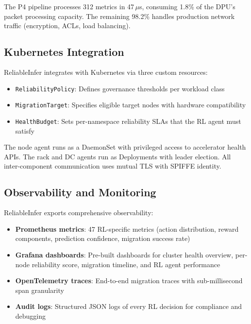 \documentclass[conference,10pt,letterpaper]{IEEEtran}
\begin{document}
The P4 pipeline processes 312 metrics in 47\,$\mu$s, consuming 1.8\% of the DPU's packet processing capacity. The remaining 98.2\% handles production network traffic (encryption, ACLs, load balancing).

\subsection{Kubernetes Integration}

ReliableInfer integrates with Kubernetes via three custom resources:
\begin{itemize}
\item \texttt{ReliabilityPolicy}: Defines governance thresholds per workload class
\item \texttt{MigrationTarget}: Specifies eligible target nodes with hardware compatibility
\item \texttt{HealthBudget}: Sets per-namespace reliability SLAs that the RL agent must satisfy
\end{itemize}

The node agent runs as a DaemonSet with privileged access to accelerator health APIs. The rack and DC agents run as Deployments with leader election. All inter-component communication uses mutual TLS with SPIFFE identity.

\subsection{Observability and Monitoring}

ReliableInfer exports comprehensive observability:
\begin{itemize}
\item \textbf{Prometheus metrics}: 47 RL-specific metrics (action distribution, reward components, prediction confidence, migration success rate)
\item \textbf{Grafana dashboards}: Pre-built dashboards for cluster health overview, per-node reliability score, migration timeline, and RL agent performance
\item \textbf{OpenTelemetry traces}: End-to-end migration traces with sub-millisecond span granularity
\item \textbf{Audit logs}: Structured JSON logs of every RL decision for compliance and debugging
\end{itemize}
\end{document}
